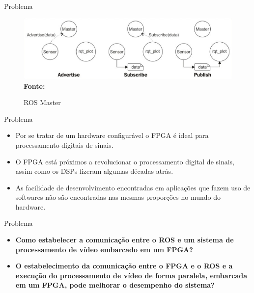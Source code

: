 \documentclass[10pt]{beamer}
\begin{document}
{
\begin{frame}[fragile]{Problema}

\begin{figure}[h]
	\caption{ROS Master}
	\begin{center}
		\includegraphics[scale=0.71]{rosMaster.png}\\
		{\small \textbf{Fonte:}\cite{ROSeffect}}
\end{center}
\label{fig:rosmaster}
\end{figure}

\end{frame}
}

{
\begin{frame}[fragile]{Problema}
    \begin{itemize}
        \item Por se tratar de um hardware configurável o FPGA é ideal para processamento digitais de sinais.
      
        \item O FPGA está próximos a revolucionar o processamento digital de sinais, assim como os DSPs fizeram algumas décadas atrás.
       
        \item As facilidade de desenvolvimento encontradas em aplicações que fazem uso de softwares não são encontradas nas mesmas proporções no mundo do hardware.
    \end{itemize}
\end{frame}
}


{
\begin{frame}[fragile]{Problema}
\begin{itemize}
	\item \textbf{Como estabelecer a comunicação entre o ROS e um sistema de processamento de vídeo embarcado em um FPGA? }
\end{itemize}


\begin{itemize}
	\item \textbf{O estabelecimento da comunicação entre o FPGA e o ROS e a execução do processamento de vídeo de forma paralela, embarcada em um FPGA, pode melhorar o desempenho do sistema?}
\end{itemize}


\end{frame}
}
\end{document}
